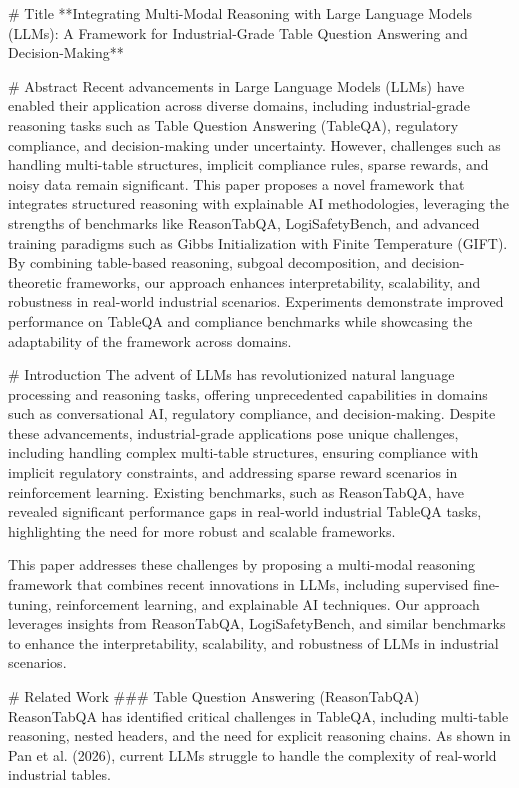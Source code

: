 # Title  
**Integrating Multi-Modal Reasoning with Large Language Models (LLMs): A Framework for Industrial-Grade Table Question Answering and Decision-Making**  

# Abstract  
Recent advancements in Large Language Models (LLMs) have enabled their application across diverse domains, including industrial-grade reasoning tasks such as Table Question Answering (TableQA), regulatory compliance, and decision-making under uncertainty. However, challenges such as handling multi-table structures, implicit compliance rules, sparse rewards, and noisy data remain significant. This paper proposes a novel framework that integrates structured reasoning with explainable AI methodologies, leveraging the strengths of benchmarks like ReasonTabQA, LogiSafetyBench, and advanced training paradigms such as Gibbs Initialization with Finite Temperature (GIFT). By combining table-based reasoning, subgoal decomposition, and decision-theoretic frameworks, our approach enhances interpretability, scalability, and robustness in real-world industrial scenarios. Experiments demonstrate improved performance on TableQA and compliance benchmarks while showcasing the adaptability of the framework across domains.  

# Introduction  
The advent of LLMs has revolutionized natural language processing and reasoning tasks, offering unprecedented capabilities in domains such as conversational AI, regulatory compliance, and decision-making. Despite these advancements, industrial-grade applications pose unique challenges, including handling complex multi-table structures, ensuring compliance with implicit regulatory constraints, and addressing sparse reward scenarios in reinforcement learning. Existing benchmarks, such as ReasonTabQA, have revealed significant performance gaps in real-world industrial TableQA tasks, highlighting the need for more robust and scalable frameworks.  

This paper addresses these challenges by proposing a multi-modal reasoning framework that combines recent innovations in LLMs, including supervised fine-tuning, reinforcement learning, and explainable AI techniques. Our approach leverages insights from ReasonTabQA, LogiSafetyBench, and similar benchmarks to enhance the interpretability, scalability, and robustness of LLMs in industrial scenarios.  

# Related Work  
### Table Question Answering (ReasonTabQA)  
ReasonTabQA has identified critical challenges in TableQA, including multi-table reasoning, nested headers, and the need for explicit reasoning chains. As shown in Pan et al. (2026), current LLMs struggle to handle the complexity of real-world industrial tables.  


